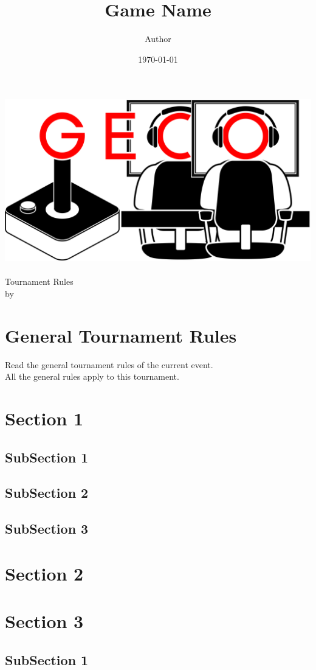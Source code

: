 \documentclass{article}
\title{Game Name}
\author{Author}
\date{\today}
\begin{document}
\makeatletter
\begin{titlepage}
\centering
\includegraphics[scale=0.075]{../img/GECo.png}\\
\LARGE \@title\\ Tournament Rules\\ \normalsize by \@author\\ \@date
\end{titlepage}
\makeatother


\clearpage

\tableofcontents
\clearpage

\section{General Tournament Rules}
Read the general tournament rules of the current event.\\
All the general rules apply to this tournament.

\section{Section 1}
\subsection{SubSection 1}

\subsection{SubSection 2}

\subsection{SubSection 3}


\section{Section 2}

\section{Section 3}
\subsection{SubSection 1}
\end{document}
